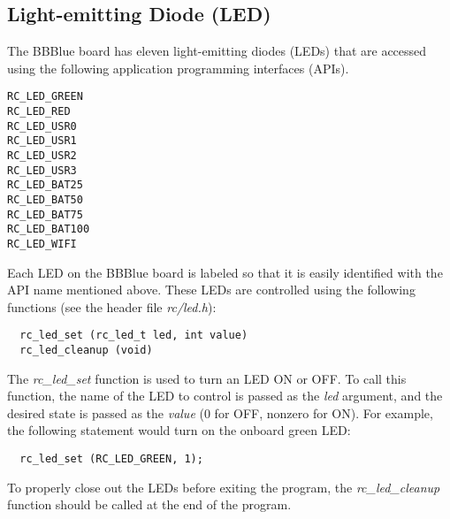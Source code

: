 \subsection{Light-emitting Diode (LED)}
\label{sec:LEDs}

The BBBlue board has eleven light-emitting diodes (LEDs) that are accessed using the following application programming interfaces (APIs).
\begin{center}
\begin{verbatim}
RC_LED_GREEN
RC_LED_RED
RC_LED_USR0
RC_LED_USR1
RC_LED_USR2
RC_LED_USR3
RC_LED_BAT25
RC_LED_BAT50
RC_LED_BAT75
RC_LED_BAT100
RC_LED_WIFI
\end{verbatim}
\end{center}
%
Each LED on the BBBlue board is labeled so that it is easily identified with the API name mentioned above. These LEDs are controlled using the following functions (see the header file \emph{rc/led.h}): %
%
\begin{verbatim}
  rc_led_set (rc_led_t led, int value)
  rc_led_cleanup (void)
\end{verbatim}
%
The \emph{rc\_led\_set} function is used to turn an LED ON or OFF. To call this function, the name of the LED to control is passed as the \emph{led} argument, and the desired state is passed as the \emph{value} ($0$ for OFF, nonzero for ON). For example, the following statement would turn on the onboard green LED: %
%
\begin{verbatim}
  rc_led_set (RC_LED_GREEN, 1);
\end{verbatim}
%
To properly close out the LEDs before exiting the program, the \emph{rc\_led\_cleanup} function should be called at the end of the program. %

